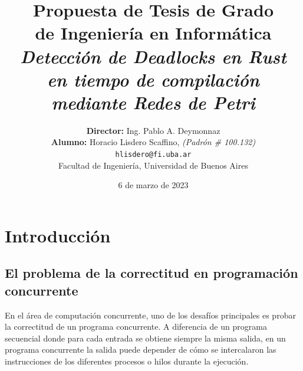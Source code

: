 \documentclass[12pt]{article}
\begin{document}
\begin{titlepage}

    \title{     \textbf{Propuesta de Tesis de Grado \\ de Ingeniería en Informática}\\[2.5ex]
        \textit{Detección de Deadlocks en Rust \\en tiempo de compilación \\mediante Redes de Petri} }

    \author{
        \textbf{Director:} Ing. Pablo A. Deymonnaz\\[2.5ex]
        \textbf{Alumno:} Horacio Lisdero Scaffino, \textit{(Padrón \# 100.132)}                                \\
        \texttt{ hlisdero@fi.uba.ar }                                    \\[2.5ex]
        \normalsize{Facultad de Ingeniería, Universidad de Buenos Aires}        \\
    }

    \date{6 de marzo de 2023}

\end{titlepage}

\maketitle
\thispagestyle{empty}

\maketitle{
    \hypersetup{linkcolor=black}
    \tableofcontents
}

\section{Introducción}

\subsection{El problema de la correctitud en programación concurrente}

En el área de computación concurrente, uno de los desafíos principales es probar la correctitud de un programa concurrente.
A diferencia de un programa secuencial donde para cada entrada se obtiene siempre la misma salida, en un programa concurrente
la salida puede depender de cómo se intercalaron las instrucciones de los diferentes procesos o hilos durante la ejecución.
\end{document}

